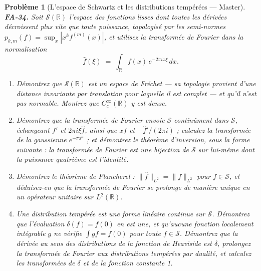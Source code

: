 \documentclass[11pt]{article}
\newtheorem{problem}{Problème}
\begin{document}
\begin{problem}[{L'espace de Schwartz et les distributions tempérées --- Master}]
\textbf{FA-34.} Soit $ \mathcal{S}(\mathbb{R}) $ l'espace des fonctions lisses dont toutes les
dérivées décroissent plus vite que toute puissance, topologisé par les semi-normes
$ p_{k,m}(f) = \sup_{x} |x^k f^{(m)}(x)| $, et utilisez la transformée de Fourier dans la
normalisation
\[ \hat{f}(\xi) \;=\; \int_{\mathbb{R}} f(x)\, e^{-2\pi i x\xi}\, dx . \]
\begin{enumerate}
\item[(a)] Démontrez que $ \mathcal{S}(\mathbb{R}) $ est un espace de Fréchet --- sa topologie provient d'une
distance invariante par translation pour laquelle il est complet --- et qu'il n'est pas normable. Montrez
que $ C_c^{\infty}(\mathbb{R}) $ y est dense.
\item[(b)] Démontrez que la transformée de Fourier envoie $ \mathcal{S} $ continûment dans
$ \mathcal{S} $, échangeant $ f' $ et $ 2\pi i \xi \hat{f} $, ainsi que $ xf $ et
$ -\hat{f}'/(2\pi i) $ ; calculez la transformée de la gaussienne $ e^{-\pi x^2} $ ; et démontrez
le théorème d'inversion, sous la forme suivante : la transformée de Fourier est une bijection de
$ \mathcal{S} $ sur lui-même dont la puissance quatrième est l'identité.
\item[(c)] Démontrez le théorème de Plancherel : $ \|\hat{f}\|_{L^2} = \|f\|_{L^2} $ pour
$ f \in \mathcal{S} $, et déduisez-en que la transformée de Fourier se prolonge de manière unique en
un opérateur unitaire sur $ L^2(\mathbb{R}) $.
\item[(d)] Une \textit{distribution tempérée} est une forme linéaire continue sur $ \mathcal{S} $. Démontrez
que l'évaluation $ \delta(f) = f(0) $ en est une, et qu'aucune fonction localement intégrable
$ g $ ne vérifie $ \int g f = f(0) $ pour toute $ f \in \mathcal{S} $. Démontrez que la dérivée
au sens des distributions de la fonction de Heaviside est $ \delta $, prolongez la transformée de
Fourier aux distributions tempérées par dualité, et calculez les transformées de $ \delta $ et de la
fonction constante 1.
\end{enumerate}

\end{problem}
\end{document}
